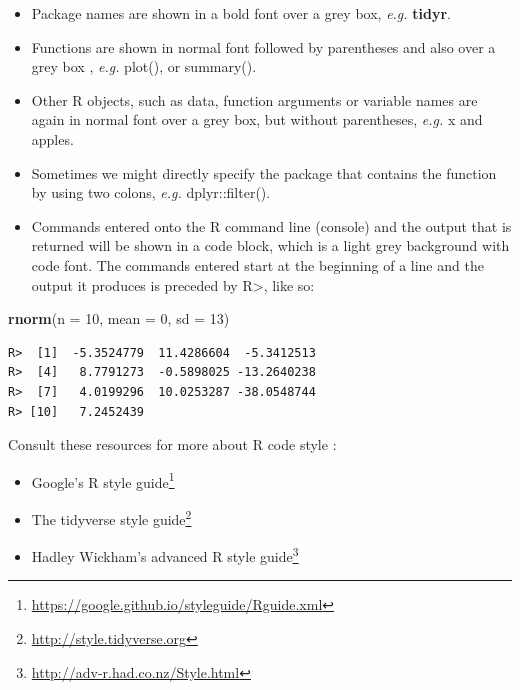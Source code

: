 \documentclass[english,10pt,a4paper,oneside]{book}
\renewcommand{\href}[2]{#2\footnote{\url{#1}}}
\let\rmarkdownfootnote\footnote%
\def\footnote{\protect\rmarkdownfootnote}
\providecommand{\tightlist}{%
  \setlength{\itemsep}{0pt}\setlength{\parskip}{0pt}}
\newenvironment{Shaded}{\begin{snugshade}}{\end{snugshade}}
\newcommand{\KeywordTok}[1]{\textcolor[rgb]{0.12,0.11,0.11}{\textbf{#1}}}
\newcommand{\DataTypeTok}[1]{\textcolor[rgb]{0.00,0.34,0.68}{#1}}
\newcommand{\DecValTok}[1]{\textcolor[rgb]{0.69,0.50,0.00}{#1}}
\newcommand{\NormalTok}[1]{\textcolor[rgb]{0.12,0.11,0.11}{#1}}
\renewcommand\texttt[1]{{\ttfamily\color{ttcolor}#1}}
\theoremstyle{definition}
\theoremstyle{definition}
\theoremstyle{definition}
\theoremstyle{remark}
\begin{document}
\begin{itemize}
\tightlist
\item
  Package names are shown in a bold font over a grey box, \emph{e.g.}
  \textbf{\texttt{tidyr}}.
\item
  Functions are shown in normal font followed by parentheses and also
  over a grey box , \emph{e.g.} \texttt{plot()}, or \texttt{summary()}.
\item
  Other R objects, such as data, function arguments or variable names
  are again in normal font over a grey box, but without parentheses,
  \emph{e.g.} \texttt{x} and \texttt{apples}.
\item
  Sometimes we might directly specify the package that contains the
  function by using two colons, \emph{e.g.} \texttt{dplyr::filter()}.
\item
  Commands entered onto the R command line (console) and the output that
  is returned will be shown in a code block, which is a light grey
  background with code font. The commands entered start at the beginning
  of a line and the output it produces is preceded by
  \texttt{R\textgreater{}}, like so:
\end{itemize}

\begin{Shaded}
\begin{Highlighting}[]
\KeywordTok{rnorm}\NormalTok{(}\DataTypeTok{n =} \DecValTok{10}\NormalTok{, }\DataTypeTok{mean =} \DecValTok{0}\NormalTok{, }\DataTypeTok{sd =} \DecValTok{13}\NormalTok{)}
\end{Highlighting}
\end{Shaded}

\begin{verbatim}
R>  [1]  -5.3524779  11.4286604  -5.3412513
R>  [4]   8.7791273  -0.5898025 -13.2640238
R>  [7]   4.0199296  10.0253287 -38.0548744
R> [10]   7.2452439
\end{verbatim}

Consult these resources for more about R code style :

\begin{itemize}
\tightlist
\item
  \href{https://google.github.io/styleguide/Rguide.xml}{Google's R style
  guide}
\item
  \href{http://style.tidyverse.org}{The tidyverse style guide}
\item
  \href{http://adv-r.had.co.nz/Style.html}{Hadley Wickham's advanced R
  style guide}
\end{itemize}
\end{document}
